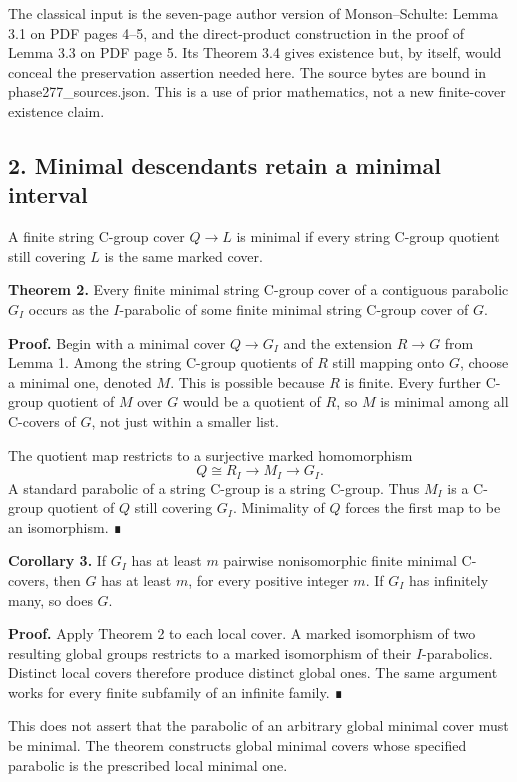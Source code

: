 \documentclass[
  11pt,
  a4paper,
]{article}
\begin{document}
The classical input is the seven-page author version of Monson--Schulte:
Lemma 3.1 on PDF pages 4--5, and the direct-product construction in the
proof of Lemma 3.3 on PDF page 5. Its Theorem 3.4 gives existence but,
by itself, would conceal the preservation assertion needed here. The
source bytes are bound in phase277\_sources.json. This is a use of prior
mathematics, not a new finite-cover existence claim.

\subsection{2. Minimal descendants retain a minimal
interval}\label{minimal-descendants-retain-a-minimal-interval}

A finite string C-group cover \(Q\to L\) is minimal if every string
C-group quotient still covering \(L\) is the same marked cover.

\textbf{Theorem 2.} Every finite minimal string C-group cover of a
contiguous parabolic \(G_I\) occurs as the \(I\)-parabolic of some
finite minimal string C-group cover of \(G\).

\textbf{Proof.} Begin with a minimal cover \(Q\to G_I\) and the
extension \(R\to G\) from Lemma 1. Among the string C-group quotients of
\(R\) still mapping onto \(G\), choose a minimal one, denoted \(M\).
This is possible because \(R\) is finite. Every further C-group quotient
of \(M\) over \(G\) would be a quotient of \(R\), so \(M\) is minimal
among all C-covers of \(G\), not just within a smaller list.

The quotient map restricts to a surjective marked homomorphism \[
 Q\cong R_I\longrightarrow M_I\longrightarrow G_I.
\] A standard parabolic of a string C-group is a string C-group. Thus
\(M_I\) is a C-group quotient of \(Q\) still covering \(G_I\).
Minimality of \(Q\) forces the first map to be an isomorphism. ∎

\textbf{Corollary 3.} If \(G_I\) has at least \(m\) pairwise
nonisomorphic finite minimal C-covers, then \(G\) has at least \(m\),
for every positive integer \(m\). If \(G_I\) has infinitely many, so
does \(G\).

\textbf{Proof.} Apply Theorem 2 to each local cover. A marked
isomorphism of two resulting global groups restricts to a marked
isomorphism of their \(I\)-parabolics. Distinct local covers therefore
produce distinct global ones. The same argument works for every finite
subfamily of an infinite family. ∎

This does not assert that the parabolic of an arbitrary global minimal
cover must be minimal. The theorem constructs global minimal covers
whose specified parabolic is the prescribed local minimal one.
\end{document}
